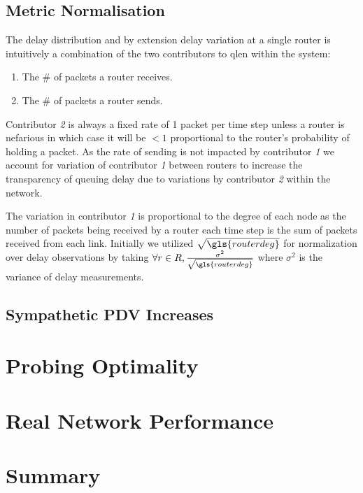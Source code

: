 \subsection{Metric Normalisation}
\label{ssec:Rmetricnormalisation}
The delay distribution and by extension delay variation at a single router is intuitively a combination of the two contributors to \gls{qlen} within the system:
\begin{enumerate}
    \item The \# of packets a router receives.
    \item The \# of packets a router sends.
\end{enumerate}
Contributor \emph{2} is always a fixed rate of 1 packet per time step unless a router is nefarious in which case it will be $<1$ proportional to the router's probability of holding a packet. As the rate of sending is not impacted by contributor \emph{1} we account for variation of contributor \emph{1} between routers to increase the transparency of queuing delay due to variations by contributor \emph{2} within the network.\par
The variation in contributor \emph{1} is proportional to the degree of each node as the number of packets being received by a router each time step is the sum of packets received from each link. Initially we utilized $\sqrt{\gls{routerdeg}}$ for normalization over delay observations by taking $\forall r\in R, \frac{\sigma^2}{\sqrt{\gls{routerdeg}}}$ where $\sigma^2$ is the variance of delay measurements.

\subsection{Sympathetic PDV Increases}
\label{ssec:Rsympathicpdv}


\section{Probing Optimality}
\label{sec:Rprobingoptimality}

\section{Real Network Performance}
\label{sec:Rrealnetworkperformance}

\section{Summary}
